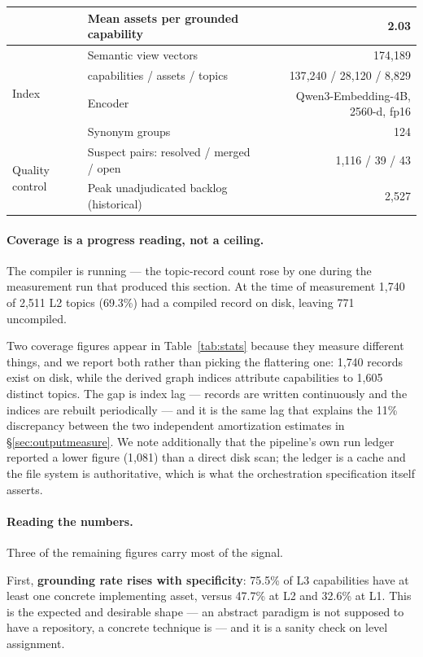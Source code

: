 \documentclass[10pt,a4paper]{article}
\begin{document}
\begin{table}[htbp]
\begin{tabular}{@{}llr@{}}
 & Mean assets per grounded capability & 2.03 \\
\midrule
\multirow{4}{*}{Index}
 & Semantic view vectors & 174{,}189 \\
 & \quad capabilities / assets / topics & 137{,}240 / 28{,}120 / 8{,}829 \\
 & Encoder & Qwen3-Embedding-4B, 2560-d, fp16 \\
 & Synonym groups & 124 \\
\midrule
\multirow{2}{*}{Quality control}
 & Suspect pairs: resolved / merged / open & 1{,}116 / 39 / 43 \\
 & Peak unadjudicated backlog (historical) & 2{,}527 \\
\bottomrule
\end{tabular}
\end{table}

\paragraph{Coverage is a progress reading, not a ceiling.} The compiler is
running --- the topic-record count rose by one during the measurement run that
produced this section. At the time of measurement 1{,}740 of 2{,}511 L2 topics
(69.3\%) had a compiled record on disk, leaving 771 uncompiled.

Two coverage figures appear in Table~\ref{tab:stats} because they measure
different things, and we report both rather than picking the flattering one:
1{,}740 records exist on disk, while the derived graph indices attribute
capabilities to 1{,}605 distinct topics. The gap is index lag --- records are
written continuously and the indices are rebuilt periodically --- and it is the
same lag that explains the 11\% discrepancy between the two independent
amortization estimates in \S\ref{sec:outputmeasure}. We note additionally that
the pipeline's own run ledger reported a lower figure (1{,}081) than a direct
disk scan; the ledger is a cache and the file system is authoritative, which is
what the orchestration specification itself asserts.

\paragraph{Reading the numbers.} Three of the remaining figures carry most of the
signal.

First, \textbf{grounding rate rises with specificity}: 75.5\% of L3 capabilities
have at least one concrete implementing asset, versus 47.7\% at L2 and 32.6\% at
L1. This is the expected and desirable shape --- an abstract paradigm is not
supposed to have a repository, a concrete technique is --- and it is a
sanity check on level assignment.
\end{document}
